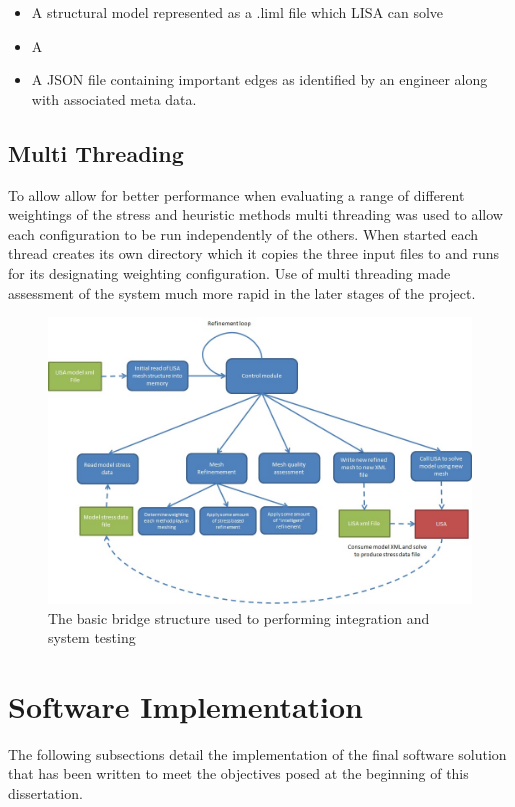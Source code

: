 \documentclass{article}
\begin{document}
\begin{itemize}
\item A structural model represented as a .liml file which LISA can solve
\item A 
\item A JSON file containing important edges as identified by an engineer 
along with associated meta data.
\end{itemize}


\subsection{Multi Threading}
To allow allow for better performance when evaluating a range of different weightings of the stress and heuristic methods multi threading was used to allow each configuration to be run independently of the others. When started each thread creates its own directory which it copies the three input files to and runs for its designating weighting configuration. Use of multi threading made assessment of the system much more rapid in the later stages of the project.






\begin{figure}[!h]
  \centerline{\includegraphics[width=150mm, scale=1]{SystemDesignDiagram.jpeg}}
  \caption{The basic bridge structure used to performing integration and system testing}
  \label{fig:h-refinementImp}
\end{figure}


\section{Software Implementation}
The following subsections detail the implementation of the final software solution that has been written to meet the objectives posed at the beginning of this dissertation.
\end{document}

